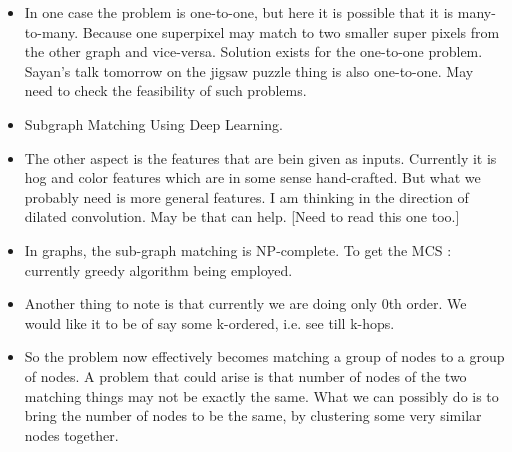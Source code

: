 \documentclass{article}
\begin{document}
\begin{itemize}
\item In one case the problem is one-to-one, but here it is possible that it is many-to-many. Because one superpixel may match to two smaller super pixels from the other graph and vice-versa. Solution exists for the one-to-one problem. Sayan's talk tomorrow on the jigsaw puzzle thing is also one-to-one. May need to check the feasibility of such problems.
\item Subgraph Matching Using Deep Learning.
\item The other aspect is the features that are bein given as inputs. Currently it is hog and color features which are in some sense hand-crafted. But what we probably need is more general features. I am thinking in the direction of dilated convolution. May be that can help. [Need to read this one too.]
\item In graphs, the sub-graph matching is NP-complete. To get the MCS : currently greedy algorithm being employed.
\item Another thing to note is that currently we are doing only 0th order. We would like it to be of say some k-ordered, i.e. see till k-hops.
\item So the problem now effectively becomes matching a group of nodes to a group of nodes. A problem that could arise is that number of nodes of the two matching things may not be exactly the same. What we can possibly do is to bring the number of nodes to be the same, by clustering some very similar nodes together.
\end{itemize}
\end{document}
